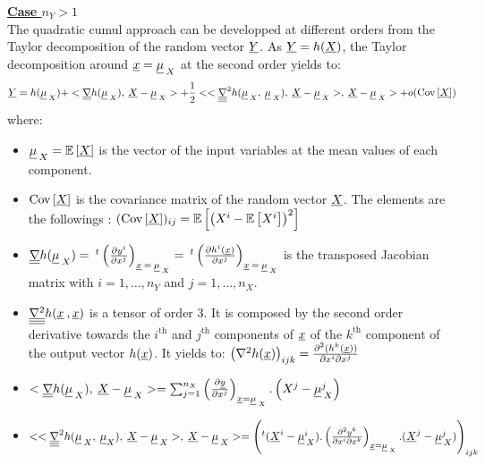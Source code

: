 {  \textbf{\underline{Case $n_Y > 1$}}\\

  The quadratic cumul approach can be developped at different orders from the Taylor decomposition of the random vector $\underline{Y}$. As $\underline{Y}=h(\underline{X})$, the Taylor decomposition around $\underline{x} = \underline{\mu}_{\:X}$ at the second order yields to:
  \begin{align*}
    \underline{Y} = h(\underline{\mu}_{\:X}) + <\underline{\underline{\nabla}}h(\underline{\mu}_{\:X}) , \: \underline{X} - \underline{\mu}_{\:X}> + \frac{1}{2}<<\underline{\underline{\underline{\nabla }}}^2 h(\underline{\mu}_{\:X},\: \underline{\mu}_{\:X}),\: \underline{X} - \underline{\mu}_{\:X}>,\: \underline{X} - \underline{\mu}_{\:X}> + o({\rm Cov}\left[ \underline{X} \right])
  \end{align*}
  where:
  \begin{itemize}
  \item $\underline{\mu}_{\:X} = {\mathbb E}\left[ \underline{X} \right]$ is the vector of the input variables at the mean values of each component.

  \item ${\rm Cov}\left[ \underline{X} \right]$ is the covariance matrix of the random vector $\underline{X}$. The elements are the followings : $({\rm Cov}\left[ \underline{X} \right])_{ij} = {\mathbb E}\left[ \left(X^i - {\mathbb E}\left[ X^i \right] \right)^2 \right]$

  \item $\underline{\underline{\nabla}} h(\underline{\mu}_{\:X}) = \: ^t \left( \frac{\partial y^i}{\partial x^j}\right)_{\underline{x}\: =\: \underline{\mu}_{\:X}} = \: ^t \left( \frac{\partial h^i(\underline{x})}{\partial x^j}\right)_{\underline{x}\: =\: \underline{\mu}_{\:X}} $ is the transposed Jacobian matrix with $i=1,\ldots,n_Y$ and $j=1,\ldots,n_X$.

  \item $\underline{\underline{\underline{\nabla^2}}} h(\underline{x}\:,\underline{x})$ is a tensor of order 3. It is composed by the second order derivative towards the $i^\textrm{th}$ and $j^\textrm{th}$ components of $\underline{x}$ of the $k^\textrm{th}$ component of the output vector $h(\underline{x})$. It yields to: $\left( \nabla^2 h(\underline{x}) \right)_{ijk} = \frac{\partial^2 (h^k(\underline{x}))}{\partial x^i \partial x^j}$

  \item $<\underline{\underline{\nabla}}h(\underline{\mu}_{\:X}) , \: \underline{X} - \underline{\mu}_{\:X}> = \sum_{j=1}^{n_X} \left( \frac{\partial {\underline{y}}}{\partial {x^j}}\right)_{\underline{x} = \underline{\mu}_{\:X}} . \left( X^j-\underline{\mu}_{\:X}^j \right)$

  \item $ <<\underline{\underline{\underline{\nabla }}}^2 h(\underline{\mu}_{\:X},\: \underline{\mu}_{X}),\: \underline{X} - \underline{\mu}_{\:X}>,\: \underline{X} - \underline{\mu}_{\:X}> = \left( ^t (\underline{X}^i - \underline{\mu}_{\:X}^i). \left(\frac{\partial^2 y^k}{\partial x^i \partial x^k}\right)_{\underline{x} = \underline{\mu}_{\:X}}. (\underline{X}^j - \underline{\mu}_{\:X}^j) \right)_{ijk}$

  \end{itemize}

}
